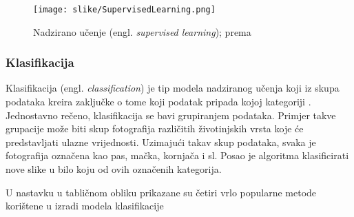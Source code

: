 \documentclass[]{foi} %
\begin{document}
\begin{figure}[H]
    \centering
    \texttt{[image: slike/SupervisedLearning.png]}
    \caption{Nadzirano učenje (engl. \textit{supervised learning}); prema \cite{MLGrafovi}}
\end{figure}

\subsubsection{Klasifikacija}
Klasifikacija (engl. \textit{classification}) je tip modela nadziranog učenja koji iz skupa podataka kreira zaključke o tome koji podatak pripada kojoj kategoriji \cite[str. 58]{AIandGames}. Jednostavno rečeno, klasifikacija se bavi grupiranjem podataka. Primjer takve grupacije može biti skup fotografija različitih životinjskih vrsta koje će predstavljati ulazne vrijednosti. Uzimajući takav skup podataka, svaka je fotografija označena kao pas, mačka, kornjača i sl. Posao je algoritma klasificirati nove slike u bilo koju od ovih označenih kategorija.

U nastavku u tabličnom obliku prikazane su četiri vrlo popularne metode korištene u izradi modela klasifikacije
\end{document}
